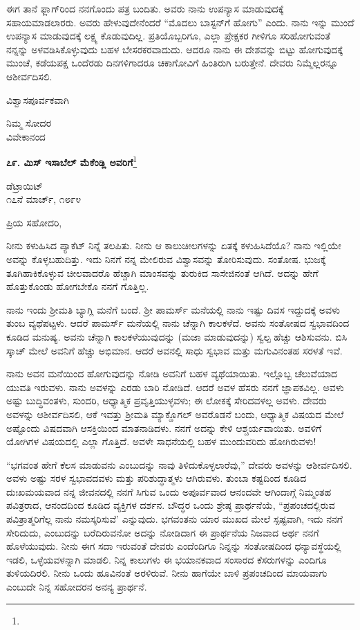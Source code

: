 ಈಗ ತಾನೆ ಫ್ಲಾಗ್‌ರಿಂದ ನನಗೊಂದು ಪತ್ರ ಬಂದಿತು. ಅವರು ನಾನು ಉಪನ್ಯಾಸ ಮಾಡುವುದಕ್ಕೆ ಸಹಾಯಮಾಡಲಾರರು. ಅವರು ಹೇಳುವುದೇನೆಂದರೆ “ಮೊದಲು ಬಾಸ್ಟನ್‌ಗೆ ಹೋಗು” ಎಂದು. ನಾನು ಇನ್ನು ಮುಂದೆ ಉಪನ್ಯಾಸ ಮಾಡುವುದಕ್ಕೆ ಲಕ್ಷ್ಯ ಕೊಡುವುದಿಲ್ಲ. ಪ್ರತಿಯೊಬ್ಬರಿಗೂ, ಎಲ್ಲಾ ಪ್ರೇಕ್ಷಕರ ಗೀಳಿಗೂ ಸರಿಹೋಗುವಂತೆ ನನ್ನನ್ನು ಅಳವಡಿಸಿಕೊಳ್ಳುವುದು ಬಹಳ ಬೇಸರಕರವಾದುದು. ಆದರೂ ನಾನು ಈ ದೇಶವನ್ನು ಬಿಟ್ಟು ಹೋಗುವುದಕ್ಕೆ ಮುಂಚೆ, ಕಡೆಯಪಕ್ಷ ಒಂದೆರಡು ದಿನಗಳಿಗಾದರೂ ಚಿಕಾಗೋವಿಗೆ ಹಿಂತಿರುಗಿ ಬರುತ್ತೇನೆ. ದೇವರು ನಿಮ್ಮೆಲ್ಲರನ್ನೂ ಆಶೀರ್ವದಿಸಲಿ.

ವಿಶ್ವಾಸಪೂರ್ವಕವಾಗಿ

\begin{flushright}
ನಿಮ್ಮ ಸೋದರ\\ವಿವೇಕಾನಂದ
\end{flushright}

\begin{center}
\textbf{೭೯. ಮಿಸ್ ಇಸಾಬೆಲ್ ಮೆಕೆಂಡ್ಲಿ ಅವರಿಗೆ}\footnote{}
\end{center}

\begin{flushright}
ಡೆಟ್ರಾಯಿಟ್\\೧೭ನೆ ಮಾರ್ಚ್, ೧೮೯೪
\end{flushright}

\noindent
ಪ್ರಿಯ ಸಹೋದರಿ,

ನೀನು ಕಳುಹಿಸಿದ ಪ್ಯಾಕೆಟ್ ನಿನ್ನೆ ತಲಪಿತು. ನೀನು ಆ ಕಾಲುಚೀಲಗಳನ್ನು ಏತಕ್ಕೆ ಕಳುಹಿಸಿದೆಯೊ? ನಾನು ಇಲ್ಲಿಯೇ ಅವನ್ನು ಕೊಳ್ಳಬಹುದಿತ್ತು. ಇದು ನಿನಗೆ ನನ್ನ ಮೇಲಿರುವ ವಿಶ್ವಾಸವನ್ನು ತೋರಿಸುವುದು. ಸಂತೋಷ. ಭುಜಕ್ಕೆ ತೂಗಿಹಾಕಿಕೊಳ್ಳುವ ಚೀಲವಾದರೊ ಹೆಚ್ಚಾಗಿ ಮಾಂಸವನ್ನು ತುರುಕಿದ ಸಾಸೇಜಿನಂತೆ ಆಗಿದೆ. ಅದನ್ನು ಹೇಗೆ ಹೊತ್ತುಕೊಂಡು ಹೋಗಬೇಕೊ ನನಗೆ ಗೊತ್ತಿಲ್ಲ.

ನಾನು ಇಂದು ಶ‍್ರೀಮತಿ ಬ್ಯಾಗ್ಲಿ ಮನೆಗೆ ಬಂದೆ. ಶ‍್ರೀ ಪಾಮ‌ರ್ಸ್ ಮನೆಯಲ್ಲಿ ನಾನು ಇಷ್ಟು ದಿವಸ ಇದ್ದುದಕ್ಕೆ ಅವಳು ತುಂಬ ವ್ಯಥೆಪಟ್ಟಳು. ಆದರೆ ಪಾಮ‌ರ್ಸ್ ಮನೆಯಲ್ಲಿ ನಾನು ಚೆನ್ನಾಗಿ ಕಾಲಕಳೆದೆ. ಅವನು ಸಂತೋಷದ ಸ್ವಭಾವದಿಂದ ಕೂಡಿದ ಮನುಷ್ಯ. ಅವನು ಚೆನ್ನಾಗಿ ಕಾಲಕಳೆಯುವುದನ್ನು (ಮಜಾ ಮಾಡುವುದನ್ನು) ಸ್ವಲ್ಪ ಹೆಚ್ಚು ಆಶಿಸುವನು. ಬಿಸಿ ಸ್ಕಾಚ್ ಮೇಲೆ ಅವನಿಗೆ ಹೆಚ್ಚು ಅಭಿಮಾನ. ಆದರೆ ಅವನಲ್ಲಿ ಸಾಧು ಸ್ವಭಾವ ಮತ್ತು ಮಗುವಿನಂತಹ ಸರಳತೆ ಇವೆ.

ನಾನು ಅವನ ಮನೆಯಿಂದ ಹೋಗುವುದನ್ನು ನೋಡಿ ಅವನಿಗೆ ಬಹಳ ವ್ಯಥೆಯಾಯಿತು. ಇಲ್ಲೊಬ್ಬ ಚೆಲುವೆಯಾದ ಯುವತಿ ಇರುವಳು. ನಾನು ಅವಳನ್ನು ಎರಡು ಬಾರಿ ನೋಡಿದೆ. ಆದರೆ ಅವಳ ಹೆಸರು ನನಗೆ ಜ್ಞಾಪಕವಿಲ್ಲ. ಅವಳು ಅಷ್ಟು ಬುದ್ಧಿವಂತಳು, ಸುಂದರಿ, ಆಧ್ಯಾತ್ಮಿಕ ಪ್ರವೃತ್ತಿಯುಳ್ಳವಳು; ಈ ಲೋಕಕ್ಕೆ ಸೇರಿದವಳಲ್ಲ ಅವಳು. ದೇವರು ಅವಳನ್ನು ಆಶೀರ್ವದಿಸಲಿ, ಆಕೆ ಇವತ್ತು ಶ‍್ರೀಮತಿ ಮ್ಯಾಕ್ಡೊಗಲ್ ಅವರೊಡನೆ ಬಂದು, ಆಧ್ಯಾತ್ಮಿಕ ವಿಷಯದ ಮೇಲೆ ಅಷ್ಟೊಂದು ವಿಷದವಾಗಿ ಆಸಕ್ತಿಯಿಂದ ಮಾತನಾಡಿದಳು. ನನಗೆ ಅದನ್ನು ಕೇಳಿ ಆಶ್ಚರ್ಯವಾಯಿತು. ಅವಳಿಗೆ ಯೋಗಿಗಳ ವಿಷಯದಲ್ಲಿ ಎಲ್ಲಾ ಗೊತ್ತಿದೆ. ಅವಳೇ ಸಾಧನೆಯಲ್ಲಿ ಬಹಳ ಮುಂದುವರಿದು ಹೋಗಿರುವಳು!

“ಭಗವಂತ ಹೇಗೆ ಕೆಲಸ ಮಾಡುವನು ಎಂಬುದನ್ನು ನಾವು ತಿಳಿದುಕೊಳ್ಳಲಾರೆವು,” ದೇವರು ಅವಳನ್ನು ಆಶೀರ್ವದಿಸಲಿ. ಅವಳು ಅಷ್ಟು ಸರಳ ಸ್ವಭಾವದವಳು ಮತ್ತು ಪರಿಶುದ್ಧಾತ್ಮಳು ಆಗಿರುವಳು. ತುಂಬಾ ಕಷ್ಟದಿಂದ ಕೂಡಿದ ದುಃಖಮಯವಾದ ನನ್ನ ಜೀವನದಲ್ಲಿ ನನಗೆ ಸಿಗುವ ಒಂದು ಅಪೂರ್ವವಾದ ಆನಂದವೇ ಆಗಿಂದಾಗ್ಗೆ ನಿಮ್ಮಂತಹ ಪವಿತ್ರರಾದ, ಆನಂದದಿಂದ ಕೂಡಿದ ವ್ಯಕ್ತಿಗಳ ದರ್ಶನ. ಬೌದ್ಧರ ಒಂದು ಶ್ರೇಷ್ಠ ಪ್ರಾರ್ಥನೆಯೆ, “ಪ್ರಪಂಚದಲ್ಲಿರುವ ಪವಿತ್ರಾತ್ಮರಿಗೆಲ್ಲ ನಾನು ನಮಸ್ಕರಿಸುವೆ’ ಎನ್ನುವುದು. ಭಗವಂತನು ಯಾರ ಮುಖದ ಮೇಲೆ ಸ್ಪಷ್ಟವಾಗಿ, ಇದು ನನಗೆ ಸೇರಿದುದು, ಎಂಬುದನ್ನು ಬರೆದಿರುವನೋ ಅದನ್ನು ನೋಡಿದಾಗ ಈ ಪ್ರಾರ್ಥನೆಯ ನಿಜವಾದ ಅರ್ಥ ನನಗೆ ಹೊಳೆಯುವುದು. ನೀನು ಈಗ ಸದಾ ಇರುವಂತೆ ದೇವರು ಎಂದೆಂದಿಗೂ ನಿನ್ನನ್ನು ಸಂತೋಷದಿಂದ ಧನ್ಯಾವಸ್ಥೆಯಲ್ಲಿ ಇಡಲಿ, ಒಳ್ಳೆಯವಳನ್ನಾಗಿ ಮಾಡಲಿ. ನಿನ್ನ ಕಾಲುಗಳು ಈ ಭಯಾನಕವಾದ ಸಂಸಾರದ ಕೆಸರುಗಳನ್ನು ಎಂದಿಗೂ ತುಳಿಯದಿರಲಿ. ನೀನು ಒಂದು ಹೂವಿನಂತೆ ಅರಳಿರುವೆ. ನೀನು ಹಾಗೆಯೇ ಬಾಳಿ ಪ್ರಪಂಚದಿಂದ ಮಾಯವಾಗು ಎಂಬುದೇ ನಿನ್ನ ಸಹೋದರನ ಅನನ್ಯ ಪ್ರಾರ್ಥನೆ.

